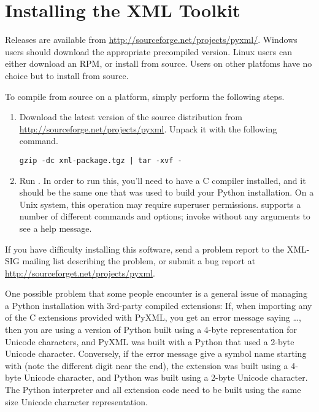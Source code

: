\documentclass{howto}
\begin{document}
\section{Installing the XML Toolkit\label{section-install}}

Releases are available from
\url{http://sourceforge.net/projects/pyxml/}.
Windows users should download the appropriate precompiled version.
Linux users can either download an RPM, or install from source.  Users
on other platfoms have no choice but to install from source.

To compile from source on a \UNIX{} platform, simply perform the
following steps.

\begin{enumerate}

\item Download the latest version of the source distribution from
\url{http://sourceforge.net/projects/pyxml}.  Unpack it with the
following command.

\begin{verbatim}
gzip -dc xml-package.tgz | tar -xvf -
\end{verbatim}

\item Run .  In order to run this,
you'll need to have a C compiler installed, and it should be the same
one that was used to build your Python installation. On a Unix system,
this operation may require superuser permissions. 
supports a number of different commands and options; invoke
 without any arguments to see a help message.

\end{enumerate}

If you have difficulty installing this software, send a problem report
to the XML-SIG mailing list describing the problem, or submit a bug report
at \url{http://sourceforget.net/projects/pyxml}.

One possible problem that some people encounter is a general issue of
managing a Python installation with 3rd-party compiled extensions:
If, when importing any of the C extensions provided with PyXML, you
get an error message saying \ldots, then you are using a version of Python built
using a 4-byte representation for Unicode characters, and PyXML was
built with a Python that used a 2-byte Unicode character.  Conversely,
if the error message give a symbol name starting with
 (note the different digit near the end), the
extension was built using a 4-byte Unicode character, and Python was
built using a 2-byte Unicode character.  The Python interpreter and
all extension code need to be built using the same size Unicode
character representation.
\end{document}
